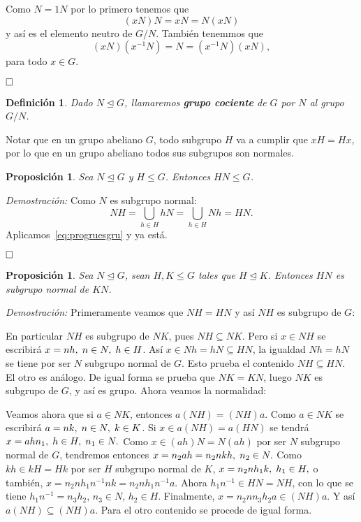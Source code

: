 \documentclass[12pt]{article}
\newtheorem{proposition}[theorem]{Proposición}
\newtheorem{definition}[theorem]{Definición}
\begin{document}
Como $N = 1N$ por lo primero tenemos que $$(xN)N=xN = N(xN)$$ y así es el elemento neutro de $G/N$. También tenemmos que $$(xN)(x^{-1}N) = N = (x^{-1}N)(xN),$$ para todo $x	\in G$.

$\hfill \square$

\begin{definition}Dado $N \unlhd G$, llamaremos \textbf{grupo cociente} de $G$ por $N$ al grupo $G/N$.
\end{definition}

Notar que en un grupo abeliano $G$, todo subgrupo $H$ va a cumplir que $xH = Hx$, por lo que en un grupo abeliano todos sus subgrupos son normales.

\begin{proposition}Sea $N \unlhd G$ y $H \leq G$. Entonces $HN \leq G$.
\end{proposition}
\emph{Demostración: }Como $N$ es subgrupo normal: $$NH = \bigcup_{h\in H} hN = \bigcup_{h\in H} Nh = HN.$$ Aplicamos~\ref{eq:progruesgru} y ya está.

$\hfill \square$

\begin{proposition}\label{eq:ej218} Sea $N \unlhd G$, sean $H, K \leq G$ tales que $H \unlhd K$. Entonces $HN$ es subgrupo normal de $KN$.
\end{proposition}
\emph{Demostración: }Primeramente veamos que $NH=HN$ y así $NH$ es subgrupo de $G$:

En particular $NH$ es subgrupo de $NK$, pues $NH \subseteq NK$. Pero si $x \in NH$ se escribirá $x = nh, \hspace{0.1cm} n \in N, \hspace{0.1cm} h \in H$. Así $x \in Nh = hN \subseteq HN$, la igualdad $Nh = hN$ se tiene por ser $N$ subgrupo normal de $G$. Esto prueba el contenido $NH \subseteq HN$. El otro es análogo. De igual forma se prueba que $NK = KN$, luego $NK$ es subgrupo de $G$, y así es grupo. Ahora veamos la normalidad:

Veamos ahora que si $a \in NK$, entonces $a(NH) = (NH)a$. Como $a \in NK$ se escribirá $a = nk, \hspace{0.1cm} n \in N, \hspace{0.1cm} k \in K$. Si $x \in a(NH) = a(HN)$ se tendrá $x = ahn_{1}, \hspace{0.1cm} h \in H, \hspace{0.1cm} n_{1} \in N.$ Como $x \in (ah)N = N(ah)$ por ser $N$ subgrupo normal de $G$, tendremos entonces $x = n_{2}ah = n_{2}nkh, \hspace{0.1cm} n_{2} \in N.$ Como $kh \in kH = Hk$ por ser $H$ subgrupo normal de $K$, $x = n_{2}nh_{1}k, \hspace{0.1cm} h_{1} \in H,$ o también, $x = n_{2}nh_{1}n^{-1}nk = n_{2}nh_{1}n^{-1}a$. Ahora $h_{1}n^{-1} \in HN = NH$, con lo que se tiene $h_{1}n^{-1} = n_{3}h_{2}$, $n_{3} \in N$, $h_{2} \in H$. Finalmente, $x = n_{2}nn_{3}h_{2}a \in (NH)a$. Y así $a(NH) \subseteq (NH)a$. Para el otro contenido se procede de igual forma.
\end{document}
